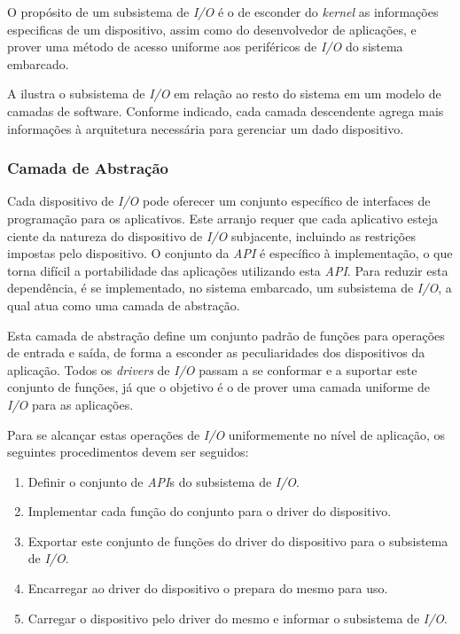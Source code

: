 O propósito de um subsistema de \emph{I/O} é o de esconder do \emph{kernel} as informações especificas de um dispositivo, assim como do desenvolvedor de aplicações, e prover uma método de acesso uniforme aos periféricos de \emph{I/O} do sistema embarcado.

A  ilustra o subsistema de \emph{I/O} em relação ao resto do sistema em um modelo de camadas de software. Conforme indicado, cada camada descendente agrega mais informações à arquitetura necessária para gerenciar um dado dispositivo.


\subsubsection{Camada de Abstração}

Cada dispositivo de \emph{I/O} pode oferecer um conjunto específico de interfaces de programação para os aplicativos. Este arranjo requer que cada aplicativo esteja ciente da natureza do dispositivo de \emph{I/O} subjacente, incluindo as restrições impostas pelo dispositivo. O conjunto da \emph{API} é específico à implementação, o que torna difícil a portabilidade das aplicações utilizando esta \emph{API}. Para reduzir esta dependência, é se implementado, no sistema embarcado, um subsistema de \emph{I/O}, a qual atua como uma camada de abstração.

Esta camada de abstração define um conjunto padrão de funções para operações de entrada e saída, de forma a esconder as peculiaridades dos dispositivos da aplicação. Todos os \emph{drivers} de \emph{I/O} passam a se conformar e a suportar este conjunto de funções, já que o objetivo é o de prover uma camada uniforme de \emph{I/O} para as aplicações. 

Para se alcançar estas operações de \emph{I/O} uniformemente no nível de aplicação, os seguintes procedimentos devem ser seguidos:

\begin{enumerate}
	\item Definir o conjunto de \emph{API}s do subsistema de \emph{I/O}.
	\item Implementar cada função do conjunto para o driver do dispositivo.
	\item Exportar este conjunto de funções do driver do dispositivo para o subsistema de \emph{I/O}.
	\item Encarregar ao driver do dispositivo o prepara do mesmo para uso.
	\item Carregar o dispositivo pelo driver do mesmo e informar o subsistema de \emph{I/O}.
\end{enumerate}

